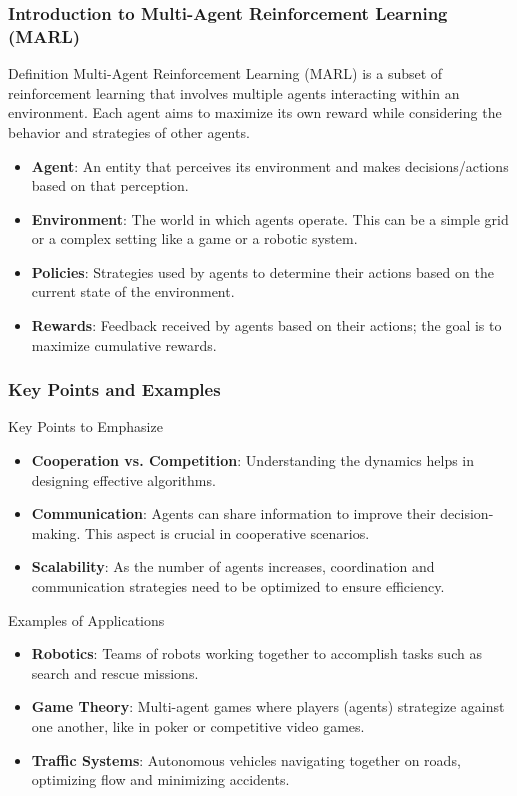 \documentclass[aspectratio=169]{beamer}
\begin{document}
\begin{frame}[fragile]
    \frametitle{Introduction to Multi-Agent Reinforcement Learning (MARL)}
    \begin{block}{Definition}
        Multi-Agent Reinforcement Learning (MARL) is a subset of reinforcement learning that involves multiple agents interacting within an environment. Each agent aims to maximize its own reward while considering the behavior and strategies of other agents.
    \end{block}

    \begin{itemize}
        \item \textbf{Agent}: An entity that perceives its environment and makes decisions/actions based on that perception.
        \item \textbf{Environment}: The world in which agents operate. This can be a simple grid or a complex setting like a game or a robotic system.
        \item \textbf{Policies}: Strategies used by agents to determine their actions based on the current state of the environment.
        \item \textbf{Rewards}: Feedback received by agents based on their actions; the goal is to maximize cumulative rewards.
    \end{itemize}
\end{frame}

\begin{frame}[fragile]
    \frametitle{Key Points and Examples}
    \begin{block}{Key Points to Emphasize}
        \begin{itemize}
            \item \textbf{Cooperation vs. Competition}: Understanding the dynamics helps in designing effective algorithms.
            \item \textbf{Communication}: Agents can share information to improve their decision-making. This aspect is crucial in cooperative scenarios.
            \item \textbf{Scalability}: As the number of agents increases, coordination and communication strategies need to be optimized to ensure efficiency.
        \end{itemize}
    \end{block}

    \begin{block}{Examples of Applications}
        \begin{itemize}
            \item \textbf{Robotics}: Teams of robots working together to accomplish tasks such as search and rescue missions.
            \item \textbf{Game Theory}: Multi-agent games where players (agents) strategize against one another, like in poker or competitive video games.
            \item \textbf{Traffic Systems}: Autonomous vehicles navigating together on roads, optimizing flow and minimizing accidents.
        \end{itemize}
    \end{block}
\end{frame}
\end{document}
